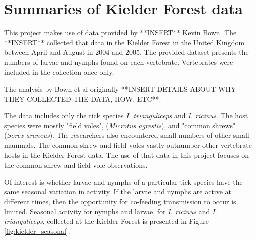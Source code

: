 \documentclass{article}
\begin{document}
\newpage

\section{Summaries of Kielder Forest data}

This project makes use of data provided by **INSERT** Kevin Bown. The **INSERT** collected that data in the Kielder Forest in the United Kingdom between April and August in 2004 and 2005. The provided dataset presents the numbers of larvae and nymphs found on each vertebrate. Vertebrates were included in the collection once only.

The analysis by Bown et al originally **INSERT DETAILS ABOUT WHY THEY COLLECTED THE DATA, HOW, ETC**.

The data includes only the tick species \textit{I. trianguliceps} and  \textit{I. ricinus}. The host species were mostly "field voles", (\textit{Microtus agrestis}), and "common shrews" (\textit{Sorex araneus}). The researchers also encountered small numbers of other small mammals. The common shrew and field voles vastly outnumber other vertebrate hosts in the Kielder Forest data. The use of that data in this project focuses on the common shrew and field vole observations. 

Of interest is whether larvae and nymphs of a particular tick species have the same seasonal variation in activity. If the larvae and nymphs are active at different times, then the opportunity for co-feeding transmission to occur is limited. Seasonal activity for nymphs and larvae, for \textit{I. ricinus} and \textit{I. trianguliceps}, collected at the Kielder Forest is presented in Figure \ref{fig:kielder_seasonal}.
\end{document}
